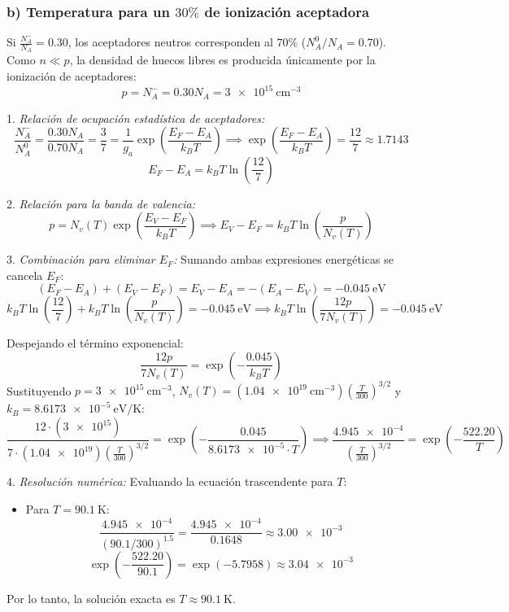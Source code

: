 \begin{problema}
\subsubsection*{b) Temperatura para un $30\%$ de ionización aceptadora}

Si $\frac{N_A^-}{N_A} = 0.30$, los aceptadores neutros corresponden al $70\%$ ($N_A^0 / N_A = 0.70$).
Como $n \ll p$, la densidad de huecos libres es producida únicamente por la ionización de aceptadores:
\[
p = N_A^- = 0.30 N_A = \SI{3e15}{\cm^{-3}}
\]

1. \textit{Relación de ocupación estadística de aceptadores:}
\[
\frac{N_A^-}{N_A^0} = \frac{0.30 N_A}{0.70 N_A} = \frac{3}{7} = \frac{1}{g_a} \exp\left( \frac{E_F - E_A}{k_B T} \right) \implies \exp\left( \frac{E_F - E_A}{k_B T} \right) = \frac{12}{7} \approx 1.7143
\]
\[
E_F - E_A = k_B T \ln\left( \frac{12}{7} \right)
\]

2. \textit{Relación para la banda de valencia:}
\[
p = N_v(T) \exp\left( \frac{E_V - E_F}{k_B T} \right) \implies E_V - E_F = k_B T \ln\left( \frac{p}{N_v(T)} \right)
\]

3. \textit{Combinación para eliminar $E_F$:}
Sumando ambas expresiones energéticas se cancela $E_F$:
\[
(E_F - E_A) + (E_V - E_F) = E_V - E_A = -(E_A - E_V) = -\SI{0.045}{\eV}
\]
\[
k_B T \ln\left( \frac{12}{7} \right) + k_B T \ln\left( \frac{p}{N_v(T)} \right) = -\SI{0.045}{\eV} \implies k_B T \ln\left( \frac{12 p}{7 N_v(T)} \right) = -\SI{0.045}{\eV}
\]

Despejando el término exponencial:
\[
\frac{12 p}{7 N_v(T)} = \exp\left( -\frac{0.045}{k_B T} \right)
\]
Sustituyendo $p = \SI{3e15}{\cm^{-3}}$, $N_v(T) = (\SI{1.04e19}{\cm^{-3}}) \left(\frac{T}{300}\right)^{3/2}$ y $k_B = \SI{8.6173e-5}{\eV/\kelvin}$:
\[
\frac{12 \cdot (\num{3e15})}{7 \cdot (\num{1.04e19}) \left( \frac{T}{300} \right)^{3/2}} = \exp\left( -\frac{0.045}{\num{8.6173e-5} \cdot T} \right) \implies \frac{\num{4.945e-4}}{\left( \frac{T}{300} \right)^{3/2}} = \exp\left( -\frac{522.20}{T} \right)
\]

4. \textit{Resolución numérica:}
Evaluando la ecuación trascendente para $T$:
\begin{itemize}
    \item Para $T = \SI{90.1}{\kelvin}$:
    \[
    \frac{\num{4.945e-4}}{(90.1/300)^{1.5}} = \frac{\num{4.945e-4}}{\num{0.1648}} \approx \num{3.00e-3}
    \]
    \[
    \exp\left(-\frac{522.20}{90.1}\right) = \exp(-5.7958) \approx \num{3.04e-3}
    \]
\end{itemize}
Por lo tanto, la solución exacta es $T \approx \SI{90.1}{\kelvin}$.


\end{problema}
